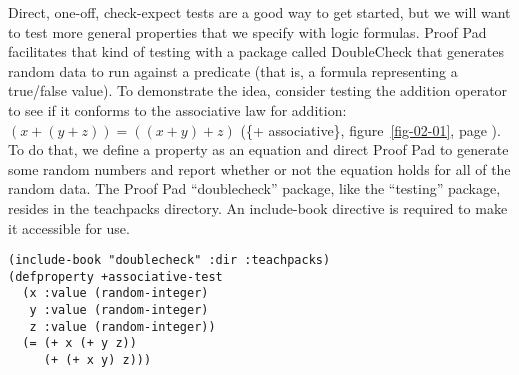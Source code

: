 Direct, one-off, \textsf{check-expect} tests
are a good way to get started, but
we will want to test more general properties that we specify with logic formulas.
Proof Pad facilitates that kind of testing
with a package called
DoubleCheck
that generates
random data
to run against a predicate
(that is, a formula representing a true/false value).
To demonstrate the idea, consider testing the addition operator to see if
it conforms to the associative law for addition: $(x + (y + z)) = ((x + y) + z)$
(\{+ associative\}, figure~\ref{fig-02-01}, page \pageref{fig-02-01}).
To do that, we define a property as an equation
and direct Proof Pad to generate some random numbers and
report whether or not the equation holds for all of the random data.
The Proof Pad ``doublecheck'' package,
like the ``testing'' package,
resides in the
teachpacks directory.
An \textsf{include-book} directive is required to make it accessible for use.

\begin{code}
\begin{verbatim}
(include-book "doublecheck" :dir :teachpacks)
(defproperty +associative-test
  (x :value (random-integer)
   y :value (random-integer)
   z :value (random-integer))
  (= (+ x (+ y z))
     (+ (+ x y) z)))
\end{verbatim}
\end{code}

